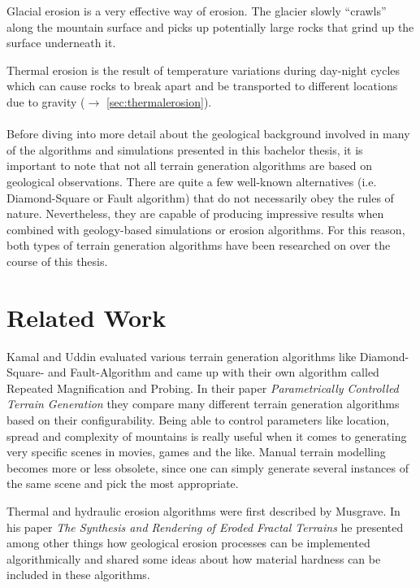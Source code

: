 \documentclass[11pt,a4paper,twoside,openright]{report}
\begin{document}
Glacial erosion is a very effective way of erosion. The glacier slowly ``crawls'' along the mountain surface and picks up potentially large rocks that grind up the surface underneath it.

Thermal erosion is the result of temperature variations during day-night cycles which can cause rocks to break apart and be transported to different locations due to gravity ($\rightarrow$ \cref{sec:thermalerosion}).
\\ \\
Before diving into more detail about the geological background involved in many of the algorithms and simulations presented in this bachelor thesis, it is important to note that not all terrain generation algorithms are based on geological observations. There are quite a few well-known alternatives (i.e. Diamond-Square or Fault algorithm) that do not necessarily obey the rules of nature. Nevertheless, they are capable of producing impressive results when combined with geology-based simulations or erosion algorithms. For this reason, both types of terrain generation algorithms have been researched on over the course of this thesis.

\chapter{Related Work}
\label{sec:related}
Kamal and Uddin evaluated various terrain generation algorithms like Diamond-Square- and Fault-Algorithm and came up with their own algorithm called Repeated Magnification and Probing. In their paper \emph{Parametrically Controlled Terrain Generation} \cite{Kamal:2007:PCT:1321261.1321264} they compare many different terrain generation algorithms based on their configurability. Being able to control parameters like location, spread and complexity of mountains is really useful when it comes to generating very specific scenes in movies, games and the like. Manual terrain modelling becomes more or less obsolete, since one can simply generate several instances of the same scene and pick the most appropriate.

Thermal and hydraulic erosion algorithms were first described by Musgrave. In his paper  \emph{The Synthesis and Rendering of Eroded Fractal Terrains} \cite{Musgrave:1989:SRE:74333.74337} he presented among other things how geological erosion processes can be implemented algorithmically and shared some ideas about how material hardness can be included in these algorithms.
\end{document}

